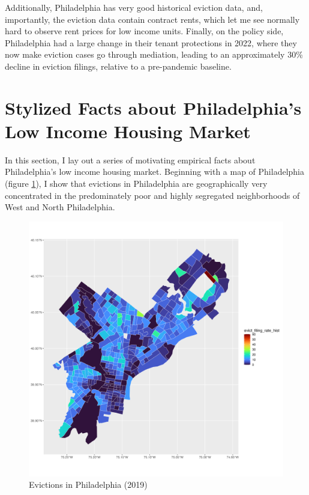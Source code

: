 \documentclass{article}
\begin{document}
Additionally, Philadelphia has very good historical eviction data, and, importantly, the eviction data contain contract rents, which let me see normally hard to observe rent prices for low income units. Finally, on the policy side, Philadelphia had a large change in their tenant protections in 2022, where they now make eviction cases go through mediation, leading to an approximately 30\% decline in eviction filings, relative to a pre-pandemic baseline.

\section{Stylized Facts about Philadelphia's Low Income Housing Market}

In this section, I lay out a series of motivating empirical facts about Philadelphia's low income housing market. Beginning with a map of Philadelphia (figure \ref{fig:philly-map}), I show that evictions in Philadelphia are geographically very concentrated in the predominately poor and highly segregated neighborhoods of West and North Philadelphia.


\begin{figure}[htbp]
    \centering
    \includegraphics[width=1\linewidth]{figs/evict_filing_rate_hist.png}
    \caption{Evictions in Philadelphia (2019)}
    \label{fig:philly-map}
\end{figure}
\end{document}
